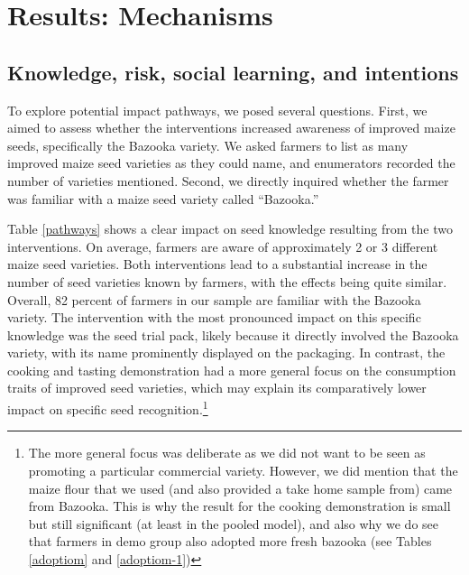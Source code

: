 \documentclass[english]{article}\usepackage[]{graphicx}\usepackage[]{xcolor}
\begin{document}
\section{Results: Mechanisms}

\subsection{Knowledge, risk, social learning, and intentions}

To explore potential impact pathways, we posed several questions.
First, we aimed to assess whether the interventions increased awareness
of improved maize seeds, specifically the Bazooka variety. We asked
farmers to list as many improved maize seed varieties as they could
name, and enumerators recorded the number of varieties mentioned.
Second, we directly inquired whether the farmer was familiar with
a maize seed variety called “Bazooka.”

Table \ref{pathways} shows a clear impact on seed knowledge resulting
from the two interventions. On average, farmers are aware of approximately
2 or 3 different maize seed varieties. Both interventions lead to
a substantial increase in the number of seed varieties known by farmers,
with the effects being quite similar. Overall, 82 percent of farmers
in our sample are familiar with the Bazooka variety. The intervention
with the most pronounced impact on this specific knowledge was the
seed trial pack, likely because it directly involved the Bazooka variety,
with its name prominently displayed on the packaging. In contrast,
the cooking and tasting demonstration had a more general focus on
the consumption traits of improved seed varieties, which may explain
its comparatively lower impact on specific seed recognition.\footnote{The more general focus was deliberate as we did not want to be seen
as promoting a particular commercial variety. However, we did mention
that the maize flour that we used (and also provided a take home sample
from) came from Bazooka. This is why the result for the cooking demonstration
is small but still significant (at least in the pooled model), and
also why we do see that farmers in demo group also adopted more fresh
bazooka (see Tables \ref{adoptiom} and \ref{adoptiom-1})}
\end{document}
